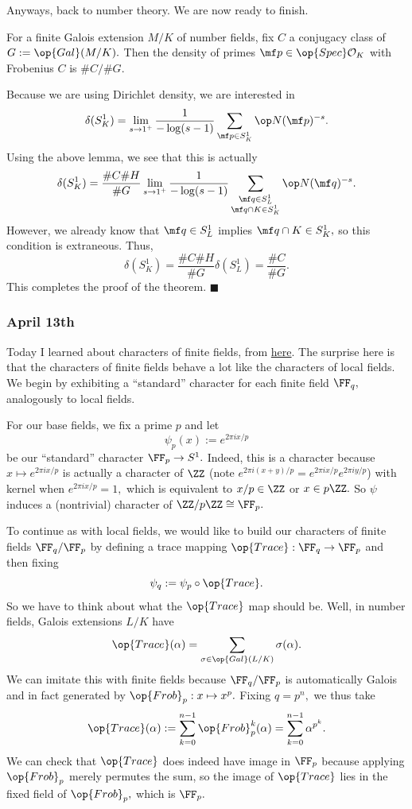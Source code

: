 Anyways, back to number theory. We are now ready to finish.
\begin{theorem}
    For a finite Galois extension $M/K$ of number fields, fix $C$ a conjugacy class of $G:=\op{Gal}(M/K).$ Then the density of primes $\mf p\in\op{Spec}\mathcal O_K$ with Frobenius $C$ is $\#C/\#G.$
\end{theorem}
Because we are using Dirichlet density, we are interested in
\[\delta(S^1_K)=\lim_{s\to1^+}\frac1{-\log(s-1)}\sum_{\mf p\in S^1_K}\op N(\mf p)^{-s}.\]
Using the above lemma, we see that this is actually
\[\delta(S^1_K)=\frac{\#C\#H}{\#G}\lim_{s\to1^+}\frac1{-\log(s-1)}\sum_{\substack{\mf q\in S^1_L\\\mf q\cap K\in S^1_K}}\op N(\mf q)^{-s}.\]
However, we already know that $\mf q\in S^1_L$ implies $\mf q\cap K\in S^1_K,$ so this condition is extraneous. Thus,
\[\delta(S^1_K)=\frac{\#C\#H}{\#G}\delta(S^1_L)=\frac{\#C}{\#G}.\]
This completes the proof of the theorem. $\blacksquare$

\subsubsection{April 13th}
Today I learned about characters of finite fields, from \href{https://www.dropbox.com/s/tol357wd8wc7qi9/notes_chan.pdf}{here}. The surprise here is that the characters of finite fields behave a lot like the characters of local fields. We begin by exhibiting a ``standard'' character for each finite field $\FF_q,$ analogously to local fields.

For our base fields, we fix a prime $p$ and let
\[\psi_p(x):=e^{2\pi ix/p}\]
be our ``standard'' character $\FF_p\to S^1.$ Indeed, this is a character because $x\mapsto e^{2\pi ix/p}$ is actually a character of $\ZZ$ (note $e^{2\pi i(x+y)/p}=e^{2\pi ix/p}e^{2\pi iy/p}$) with kernel when $e^{2\pi ix/p}=1,$ which is equivalent to $x/p\in\ZZ$ or $x\in p\ZZ.$ So $\psi$ induces a (nontrivial) character of $\ZZ/p\ZZ\cong\FF_p.$

To continue as with local fields, we would like to build our characters of finite fields $\FF_q/\FF_p$ by defining a trace mapping $\op{Trace}:\FF_q\to\FF_p$ and then fixing
\[\psi_q:=\psi_p\circ\op{Trace}.\]
So we have to think about what the $\op{Trace}$ map should be. Well, in number fields, Galois extensions $L/K$ have
\[\op{Trace}(\alpha)=\sum_{\sigma\in\op{Gal}(L/K)}\sigma(\alpha).\]
We can imitate this with finite fields because $\FF_q/\FF_p$ is automatically Galois and in fact generated by $\op{Frob}_p:x\mapsto x^p.$ Fixing $q=p^n,$ we thus take
\[\op{Trace}(\alpha):=\sum_{k=0}^{n-1}\op{Frob}_p^k(\alpha)=\sum_{k=0}^{n-1}\alpha^{p^k}.\]
We can check that $\op{Trace}$ does indeed have image in $\FF_p$ because applying $\op{Frob}_p$ merely permutes the sum, so the image of $\op{Trace}$ lies in the fixed field of $\op{Frob}_p,$ which is $\FF_p.$

